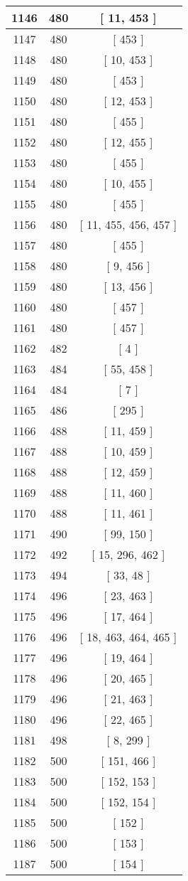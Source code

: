 \begin{center}
\begin{longtable}[H]{|| c c c ||}
\hline
1146 & 480 & [ 11, 453 ] \\ 
\hline
1147 & 480 & [ 453 ] \\ 
\hline
1148 & 480 & [ 10, 453 ] \\ 
\hline
1149 & 480 & [ 453 ] \\ 
\hline
1150 & 480 & [ 12, 453 ] \\ 
\hline
1151 & 480 & [ 455 ] \\ 
\hline
1152 & 480 & [ 12, 455 ] \\ 
\hline
1153 & 480 & [ 455 ] \\ 
\hline
1154 & 480 & [ 10, 455 ] \\ 
\hline
1155 & 480 & [ 455 ] \\ 
\hline
1156 & 480 & [ 11, 455, 456, 457 ] \\ 
\hline
1157 & 480 & [ 455 ] \\ 
\hline
1158 & 480 & [ 9, 456 ] \\ 
\hline
1159 & 480 & [ 13, 456 ] \\ 
\hline
1160 & 480 & [ 457 ] \\ 
\hline
1161 & 480 & [ 457 ] \\ 
\hline
1162 & 482 & [ 4 ] \\ 
\hline
1163 & 484 & [ 55, 458 ] \\ 
\hline
1164 & 484 & [ 7 ] \\ 
\hline
1165 & 486 & [ 295 ] \\ 
\hline
1166 & 488 & [ 11, 459 ] \\ 
\hline
1167 & 488 & [ 10, 459 ] \\ 
\hline
1168 & 488 & [ 12, 459 ] \\ 
\hline
1169 & 488 & [ 11, 460 ] \\ 
\hline
1170 & 488 & [ 11, 461 ] \\ 
\hline
1171 & 490 & [ 99, 150 ] \\ 
\hline
1172 & 492 & [ 15, 296, 462 ] \\ 
\hline
1173 & 494 & [ 33, 48 ] \\ 
\hline
1174 & 496 & [ 23, 463 ] \\ 
\hline
1175 & 496 & [ 17, 464 ] \\ 
\hline
1176 & 496 & [ 18, 463, 464, 465 ] \\ 
\hline
1177 & 496 & [ 19, 464 ] \\ 
\hline
1178 & 496 & [ 20, 465 ] \\ 
\hline
1179 & 496 & [ 21, 463 ] \\ 
\hline
1180 & 496 & [ 22, 465 ] \\ 
\hline
1181 & 498 & [ 8, 299 ] \\ 
\hline
1182 & 500 & [ 151, 466 ] \\ 
\hline
1183 & 500 & [ 152, 153 ] \\ 
\hline
1184 & 500 & [ 152, 154 ] \\ 
\hline
1185 & 500 & [ 152 ] \\ 
\hline
1186 & 500 & [ 153 ] \\ 
\hline
1187 & 500 & [ 154 ] \\ 
\hline
\end{longtable}
\end{center}

